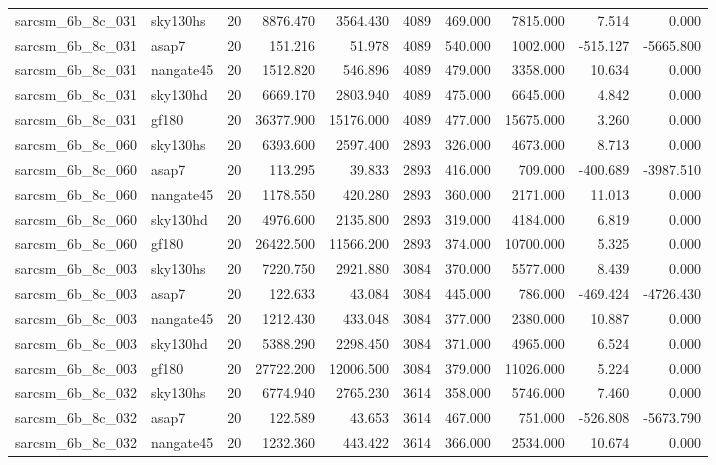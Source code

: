 \begin{longtable}{llrrrrrrrr}
sarcsm\_6b\_8c\_031 & sky130hs & 20 & 8876.470 & 3564.430 & 4089 & 469.000 & 7815.000 & 7.514 & 0.000 \\
sarcsm\_6b\_8c\_031 & asap7 & 20 & 151.216 & 51.978 & 4089 & 540.000 & 1002.000 & -515.127 & -5665.800 \\
sarcsm\_6b\_8c\_031 & nangate45 & 20 & 1512.820 & 546.896 & 4089 & 479.000 & 3358.000 & 10.634 & 0.000 \\
sarcsm\_6b\_8c\_031 & sky130hd & 20 & 6669.170 & 2803.940 & 4089 & 475.000 & 6645.000 & 4.842 & 0.000 \\
sarcsm\_6b\_8c\_031 & gf180 & 20 & 36377.900 & 15176.000 & 4089 & 477.000 & 15675.000 & 3.260 & 0.000 \\
sarcsm\_6b\_8c\_060 & sky130hs & 20 & 6393.600 & 2597.400 & 2893 & 326.000 & 4673.000 & 8.713 & 0.000 \\
sarcsm\_6b\_8c\_060 & asap7 & 20 & 113.295 & 39.833 & 2893 & 416.000 & 709.000 & -400.689 & -3987.510 \\
sarcsm\_6b\_8c\_060 & nangate45 & 20 & 1178.550 & 420.280 & 2893 & 360.000 & 2171.000 & 11.013 & 0.000 \\
sarcsm\_6b\_8c\_060 & sky130hd & 20 & 4976.600 & 2135.800 & 2893 & 319.000 & 4184.000 & 6.819 & 0.000 \\
sarcsm\_6b\_8c\_060 & gf180 & 20 & 26422.500 & 11566.200 & 2893 & 374.000 & 10700.000 & 5.325 & 0.000 \\
sarcsm\_6b\_8c\_003 & sky130hs & 20 & 7220.750 & 2921.880 & 3084 & 370.000 & 5577.000 & 8.439 & 0.000 \\
sarcsm\_6b\_8c\_003 & asap7 & 20 & 122.633 & 43.084 & 3084 & 445.000 & 786.000 & -469.424 & -4726.430 \\
sarcsm\_6b\_8c\_003 & nangate45 & 20 & 1212.430 & 433.048 & 3084 & 377.000 & 2380.000 & 10.887 & 0.000 \\
sarcsm\_6b\_8c\_003 & sky130hd & 20 & 5388.290 & 2298.450 & 3084 & 371.000 & 4965.000 & 6.524 & 0.000 \\
sarcsm\_6b\_8c\_003 & gf180 & 20 & 27722.200 & 12006.500 & 3084 & 379.000 & 11026.000 & 5.224 & 0.000 \\
sarcsm\_6b\_8c\_032 & sky130hs & 20 & 6774.940 & 2765.230 & 3614 & 358.000 & 5746.000 & 7.460 & 0.000 \\
sarcsm\_6b\_8c\_032 & asap7 & 20 & 122.589 & 43.653 & 3614 & 467.000 & 751.000 & -526.808 & -5673.790 \\
sarcsm\_6b\_8c\_032 & nangate45 & 20 & 1232.360 & 443.422 & 3614 & 366.000 & 2534.000 & 10.674 & 0.000 \\

\end{longtable}
